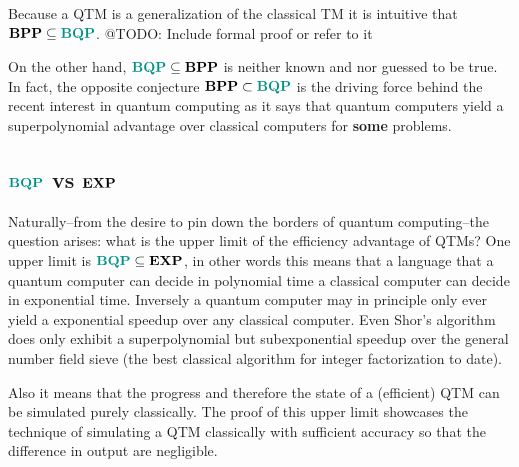 Because a \ac{QTM} is a generalization of the classical \ac{TM} it is intuitive that $\BPP\subseteq\BQP$.
@TODO: Include formal proof or refer to it

On the other hand, $\BQP\subseteq\BPP$ is neither known and nor guessed to be true.
In fact, the opposite conjecture $\BPP\subset\BQP$ is the driving force behind the recent interest in quantum computing as it says that quantum computers yield a superpolynomial advantage over classical computers for \textbf{some} problems.

\subsection{$\BQP$ vs $\mathbf{EXP}$}

Naturally--from the desire to pin down the borders of quantum computing--the question arises: what is the upper limit of the efficiency advantage of \acp{QTM}?
One upper limit is $\BQP\subseteq\EXP$, in other words this means that a language that a quantum computer can decide in polynomial time a classical computer can decide in exponential time.
Inversely a quantum computer may in principle only ever yield a exponential speedup over any classical computer.
Even Shor's algorithm \cite{shor_1997} does only exhibit a superpolynomial but subexponential speedup over the general number field sieve (the best classical algorithm for integer factorization to date).

Also it means that the progress and therefore the state of a (efficient) \ac{QTM} can be simulated purely classically.
The proof of this upper limit showcases the technique of simulating a \ac{QTM} classically with sufficient accuracy so that the difference in output are negligible.

